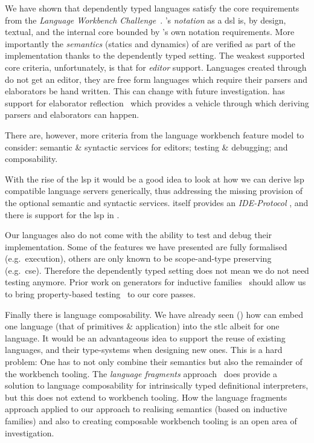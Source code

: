 We have shown that dependently typed languages satisfy the core requirements from the \emph{Language Workbench Challenge}~\cite{DBLP:conf/sle/ErdwegSVBBCGHKLKMPPSSSVVVWW13}.
%
\Velo{}'s \emph{notation} as a \ac{dsl} is, by design, textual, and the internal core bounded by \Idris{}'s own notation requirements.
%
More importantly the \emph{semantics} (statics and dynamics) of \Velo{}
are verified as part of the implementation thanks to the dependently typed setting.
%
The weakest supported core criteria, unfortunately, is that for \emph{editor} support.
%
Languages created through \Idris{} do not get an editor, they are free form languages which require their parsers and elaborators be hand written.
This can change with future investigation.
\Idris{} has support for elaborator reflection~\cite{DBLP:conf/icfp/ChristiansenB16} which provides a vehicle through which deriving parsers and elaborators can happen.


There are, however, more criteria from the language workbench feature model to consider:
%
semantic \& syntactic services for editors;
%
testing \& debugging;
%
and
%
composability.
%

With the rise of the \ac{lsp} it would be a good idea to look at how we can derive \ac{lsp} compatible language servers generically, thus addressing the missing provision of the optional semantic and syntactic services.
\Idris{} itself provides an \emph{IDE-Protocol}
, and there is support for the \ac{lsp} in \Idris{}.

Our languages also do not come with the ability to test and debug their
implementation.
%
Some of the features we have presented are fully formalised (e.g.\ execution),
others are only known to be scope-and-type preserving (e.g.\ \ac{cse}).
%
Therefore the dependently typed setting does not mean we do not need testing
anymore.
%
Prior work on generators for inductive families~\cite{DBLP:journals/pacmpl/LampropoulosPP18}
should allow us to bring property-based testing~\cite{DBLP:conf/icfp/ClaessenH00} to our core passes.


Finally there is language composability.
%
We have already seen () how \Velo{} can embed one language (that of primitives \& application) into the \ac{stlc} albeit for one language.
%
It would be an advantageous idea to support the reuse of existing languages, and their type-systems when designing new ones.
%
This is a hard problem:
%
One has to not only combine their semantics but also the remainder of the workbench tooling.
%
The \emph{language fragments} approach~\cite{10.1145/3563355} does provide a solution to language composability for intrinsically typed definitional interpreters, but this does not extend to workbench tooling.
How the language fragments approach applied to our approach to realising semantics (based on inductive families) and also to creating composable workbench tooling is an open area of investigation.


